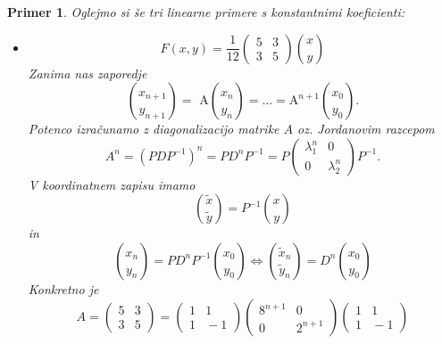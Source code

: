 \documentclass{article}
\newtheorem{primer}{Primer}
\begin{document}
\begin{primer}
Oglejmo si še tri linearne primere s konstantnimi koeficienti:
\begin{itemize}
    \item $$ F(x, y)= \frac{1}{12}\left(\begin{array}{ll}
    5 & 3 \\
    3 & 5
    \end{array}\right)\binom{x}{y}$$
Zanima nas zaporedje 
$$
\binom{x_{n+1}}{y_{n+1}} = \text{ A} \binom{x_n}{y_n} = \dots = \text{A}^{n+1} \binom{x_0}{y_0} .
$$
Potenco izračunamo z diagonalizacijo matrike $A$ oz. Jordanovim razcepom
$$
A^n = (PDP^{-1})^n = PD^n P^{-1} = P \left(\begin{array}{ll}
    \lambda_1^n & 0 \\
    0 & \lambda_2^n
    \end{array}\right) P^{-1} .
$$
V koordinatnem zapisu imamo 
$$
\binom{\tilde{x}}{\tilde{y}} = P^{-1} \binom{x}{y} 
$$
in 
$$
\binom{x_n}{y_n} = PD^n P^{-1} \binom{x_0}{y_0} \iff \binom{\tilde{x}_n}{\tilde{y}_n} = D^n \binom{x_0}{y_0}
$$
Konkretno je 
$$
A = \left(\begin{array}{ll}
    5 & 3 \\
    3 & 5
    \end{array}\right) = \left(\begin{array}{ll}
    1 & 1 \\
    1 & \!\!\!-1
    \end{array}\right) \left(\begin{array}{ll}
    8^{n+1} & 0 \\
    0 & 2^{n+1}
    \end{array}\right)
    \left(\begin{array}{ll}
        1 & 1 \\
        1 & \!\!\!-1
    \end{array}\right)
$$

\begin{center}
\end{center}
\end{itemize}
\end{primer}
\end{document}
